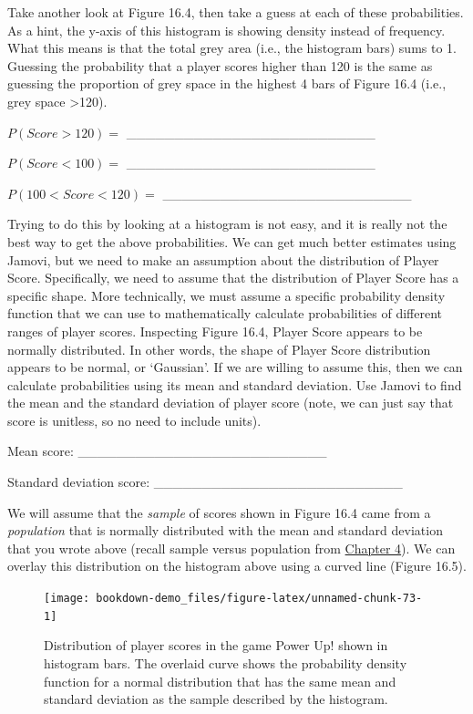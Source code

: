 \documentclass[
]{scrbook}
\begin{document}
Take another look at Figure 16.4, then take a guess at each of these probabilities.
As a hint, the y-axis of this histogram is showing density instead of frequency.
What this means is that the total grey area (i.e., the histogram bars) sums to 1.
Guessing the probability that a player scores higher than 120 is the same as guessing the proportion of grey space in the highest 4 bars of Figure 16.4 (i.e., grey space \textgreater120).

\(P(Score>120) =\) \_\_\_\_\_\_\_\_\_\_\_\_\_\_\_\_\_\_\_\_\_\_\_\_\_\_

\(P(Score<100) =\) \_\_\_\_\_\_\_\_\_\_\_\_\_\_\_\_\_\_\_\_\_\_\_\_\_\_

\(P(100<Score<120) =\) \_\_\_\_\_\_\_\_\_\_\_\_\_\_\_\_\_\_\_\_\_\_\_\_\_\_

Trying to do this by looking at a histogram is not easy, and it is really not the best way to get the above probabilities.
We can get much better estimates using Jamovi, but we need to make an assumption about the distribution of Player Score.
Specifically, we need to assume that the distribution of Player Score has a specific shape.
More technically, we must assume a specific probability density function that we can use to mathematically calculate probabilities of different ranges of player scores.
Inspecting Figure 16.4, Player Score appears to be normally distributed.
In other words, the shape of Player Score distribution appears to be normal, or `Gaussian'.
If we are willing to assume this, then we can calculate probabilities using its mean and standard deviation.
Use Jamovi to find the mean and the standard deviation of player score (note, we can just say that score is unitless, so no need to include units).

Mean score: \_\_\_\_\_\_\_\_\_\_\_\_\_\_\_\_\_\_\_\_\_\_\_\_\_\_

Standard deviation score: \_\_\_\_\_\_\_\_\_\_\_\_\_\_\_\_\_\_\_\_\_\_\_\_\_\_

We will assume that the \emph{sample} of scores shown in Figure 16.4 came from a \emph{population} that is normally distributed with the mean and standard deviation that you wrote above (recall sample versus population from \protect\hyperlink{Chapter_4}{Chapter 4}).
We can overlay this distribution on the histogram above using a curved line (Figure 16.5).

\begin{figure}
\texttt{[image: bookdown-demo\_files/figure-latex/unnamed-chunk-73-1]} \caption{Distribution of player scores in the game Power Up! shown in histogram bars. The overlaid curve shows the probability density function for a normal distribution that has the same mean and standard deviation as the sample described by the histogram.}\label{fig:unnamed-chunk-73}
\end{figure}
\end{document}
